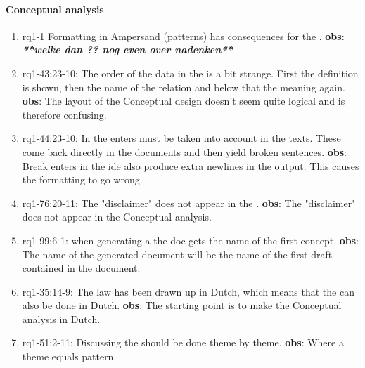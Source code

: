 \paragraph{Conceptual analysis}
\begin{enumerate}
    \item rq1-1 Formatting in Ampersand ({pattern}s) has consequences for the .
    \newline\textbf{obs}: \textbf{\textit{**welke dan ?? nog even over nadenken**}}
    
    \item rq1-43:23-10: The order of the data in the  is a bit strange.
    First the definition is shown, then the name of the relation and below that the meaning again.
    \newline\textbf{obs}: The layout of the Conceptual design doesn't seem quite logical and is therefore confusing.

    \item rq1-44:23-10: In the  enters must be taken into account in the texts.
    These come back directly in the documents and then yield broken sentences.
    \newline\textbf{obs}: Break enters in the \acrshort{ide} also produce extra newlines in the output.
    This causes the formatting to go wrong.

    \item rq1-76:20-11: The "disclaimer" does not appear in the .
    \newline\textbf{obs}: The "disclaimer" does not appear in the Conceptual analysis.

    \item rq1-99:6-1: when generating a  the doc gets the name of the first concept.
    \newline\textbf{obs}: The name of the generated document will be the name of the first draft contained in the document.

    \item rq1-35:14-9: The law has been drawn up in Dutch, which means that the  can also be done in Dutch.
    \newline\textbf{obs}: The starting point is to make the Conceptual analysis in Dutch.

    \item rq1-51:2-11: Discussing the  should be done theme by theme.
    \newline\textbf{obs}: Where a theme equals pattern.

\end{enumerate}

